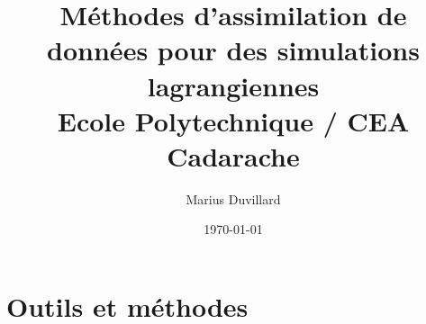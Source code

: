 \documentclass[a4paper]{report}
\title{
{Méthodes d'assimilation de données pour des simulations lagrangiennes}\\
{\large Ecole Polytechnique / CEA Cadarache}
}
\author{Marius Duvillard}
\date{\today}
\begin{document}
\maketitle
\tableofcontents





\chapter{Outils et méthodes}










% 
\printbibliography[heading=bibintoc]
% 
\end{document}
